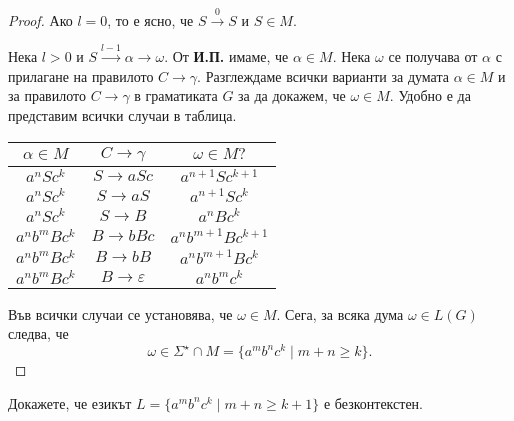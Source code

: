 \begin{proof}
  Ако $l = 0$, то е ясно, че $S \stackrel{0}{\rightarrow} S$ и $S \in M$.

  Нека $l > 0$ и $S \stackrel{l-1}{\rightarrow} \alpha \rightarrow \omega$.
  От {\bf И.П.} имаме, че $\alpha \in M$. Нека $\omega$ се получава от $\alpha$ с прилагане на правилото $C \rightarrow \gamma$.
  Разглеждаме всички варианти за думата $\alpha \in M$ и за правилото $C\rightarrow \gamma$ в граматиката $G$
  за да докажем, че  $\omega \in M$.
  Удобно е да представим всички случаи в таблица.
  \begin{center}
    \begin{tabular}{| c | c | c |}
      \hline
      $\alpha\in M$ & $C \rightarrow \gamma$ & $\omega \in M?$ \\ \hline
      $a^nSc^k$ & $S \rightarrow aSc$ & $a^{n+1}Sc^{k+1}$ \\ \hline
      $a^nSc^k$ & $S \rightarrow aS$ & $a^{n+1}Sc^{k}$ \\ \hline
      $a^nSc^k$ & $S \rightarrow B$ & $a^{n}Bc^{k}$ \\ \hline
      $a^nb^mBc^k$ & $B \rightarrow bBc$ & $a^nb^{m+1}Bc^{k+1}$\\ \hline
      $a^nb^mBc^k$ & $B \rightarrow bB$ & $a^nb^{m+1}Bc^{k}$\\ \hline
      $a^nb^mBc^k$ & $B \rightarrow \varepsilon$ & $a^nb^{m}c^{k}$\\ \hline
    \end{tabular}
  \end{center}
  Във всички случаи се установява, че $\omega \in M$.
  Сега, за всяка дума $\omega \in L(G)$ следва, че
  \[\omega \in \Sigma^\star \cap M = \{a^mb^nc^k\mid m+n \geq k\}.\]
\end{proof}


\begin{problem}
  Докажете, че езикът $L = \{a^mb^nc^k\mid m+n \geq k + 1\}$ е безконтекстен.  
\end{problem}

